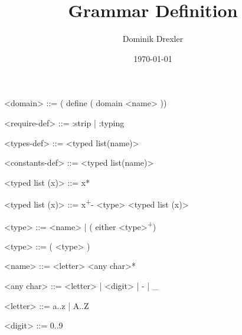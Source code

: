 \documentclass[]{article}
\title{Grammar Definition}
\author{Dominik Drexler}
\date{\today}
\begin{document}
\maketitle

\begin{grammar}
    \newcommand{\plus}{\textsuperscript{+}}
    \newcommand{\typing}{\textsuperscript{:typing~}}
    \newcommand{\fluents}{\textsuperscript{:fluents~}}

    <domain> ::= ( define ( domain <name> )   )

    <require-def> ::= :strip | :typing

    <types-def> ::= <typed list(name)>

    <constants-def> ::= <typed list(name)>

    <typed list (x)> ::= x*

    <typed list (x)> ::= x\plus - <type> <typed list (x)>

    <type> ::= <name> | ( either <type>\plus )

    <type> ::= ( <type> )

    <name> ::= <letter> <any char>*

    <any char> ::= <letter> | <digit> | - | _

    <letter> ::= a..z | A..Z

    <digit> ::= 0..9

\end{grammar}

\nocite{mcdermott-et-al-1998}



\end{document}
